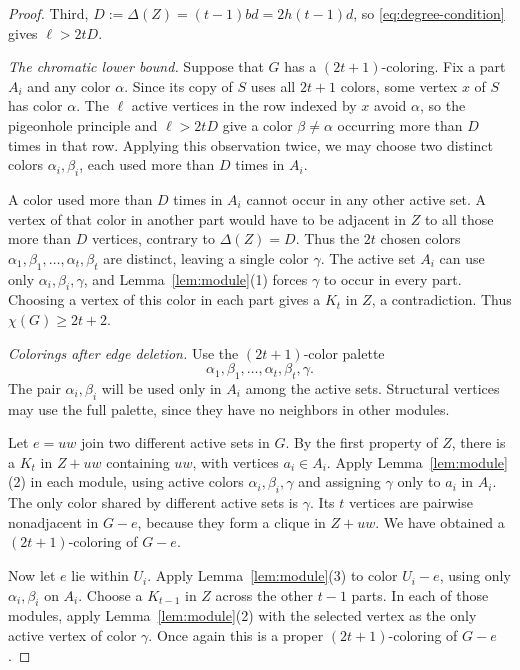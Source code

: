 \documentclass[11pt]{article}
\numberwithin{equation}{section}
\begin{document}
\begin{proof}
Third, \(D:=\Delta(Z)=(t-1)bd=2h(t-1)d\), so
\eqref{eq:degree-condition} gives \(\ell>2tD\).

\smallskip
\noindent\emph{The chromatic lower bound.}
Suppose that \(G\) has a \((2t+1)\)-coloring.
Fix a part \(A_i\) and any color \(\alpha\).
Since its copy of \(S\) uses all \(2t+1\) colors, some vertex
\(x\) of \(S\) has color \(\alpha\). The \(\ell\) active
vertices in the row indexed by \(x\) avoid \(\alpha\), so the
pigeonhole principle and \(\ell>2tD\) give a color
\(\beta\ne\alpha\) occurring more than \(D\) times in that row.
Applying this observation twice, we may choose two distinct
colors \(\alpha_i,\beta_i\), each used more than \(D\) times in \(A_i\).

A color used more than \(D\) times in \(A_i\) cannot occur in
any other active set. A vertex of that color in another part
would have to be adjacent in \(Z\) to all those more than
\(D\) vertices, contrary to \(\Delta(Z)=D\).
Thus the \(2t\) chosen colors
\(\alpha_1,\beta_1,\ldots,\alpha_t,\beta_t\) are distinct,
leaving a single color \(\gamma\).
The active set \(A_i\) can use only
\(\alpha_i,\beta_i,\gamma\), and Lemma~\ref{lem:module}(1)
forces \(\gamma\) to occur in every part.
Choosing a vertex of this color in each part gives a
\(K_t\) in \(Z\), a contradiction. Thus \(\chi(G)\ge2t+2\).

\smallskip
\noindent\emph{Colorings after edge deletion.}
Use the \((2t+1)\)-color palette
\[
 \alpha_1,\beta_1,\ldots,\alpha_t,\beta_t,\gamma.
\]
The pair \(\alpha_i,\beta_i\) will be used only in \(A_i\)
among the active sets. Structural vertices may use the full
palette, since they have no neighbors in other modules.

Let \(e=uw\) join two different active sets in \(G\).
By the first property of \(Z\), there is a \(K_t\) in
\(Z+uw\) containing \(uw\), with vertices \(a_i\in A_i\).
Apply Lemma~\ref{lem:module}(2) in each module, using active
colors \(\alpha_i,\beta_i,\gamma\) and assigning \(\gamma\)
only to \(a_i\) in \(A_i\). The only color shared by different
active sets is \(\gamma\). Its \(t\) vertices are pairwise
nonadjacent in \(G-e\), because they form a clique in \(Z+uw\).
We have obtained a \((2t+1)\)-coloring of \(G-e\).

Now let \(e\) lie within \(U_i\). Apply
Lemma~\ref{lem:module}(3) to color \(U_i-e\), using only
\(\alpha_i,\beta_i\) on \(A_i\). Choose a \(K_{t-1}\) in
\(Z\) across the other \(t-1\) parts. In each of those modules,
apply Lemma~\ref{lem:module}(2) with the selected vertex as
the only active vertex of color \(\gamma\). Once again this
is a proper \((2t+1)\)-coloring of \(G-e\).


\end{proof}
\end{document}

